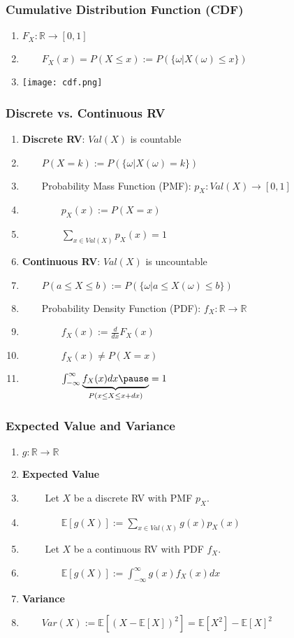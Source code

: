 \documentclass{beamer}
\begin{document}
\begin{frame}
\frametitle{Cumulative Distribution Function (CDF)}
\pause
\begin{enumerate}
\itemsep3em
\item[] $F_X:\mathbb{R}\rightarrow[0, 1]$
\pause
\item[] \indent $\qquad F_X(x)=P(X\leq x)$\pause $:=P(\{\omega|X(\omega)\leq x\})$
\pause 
\item[] \texttt{[image: cdf.png]}
\end{enumerate}
\end{frame}
\begin{frame}
\frametitle{Discrete vs. Continuous RV}
\pause
\begin{enumerate}
\itemsep0.5em
\item[] \textbf{Discrete RV}: $Val(X)$ is countable
\pause
\item[] $\qquad P(X=k):=P(\{\omega|X(\omega)=k\})$
\pause
\item[] $\qquad$Probability Mass Function (PMF): $p_X:Val(X)\rightarrow [0,1]$
\pause 
\item[] $\qquad\qquad p_X(x):=P(X=x)$
\pause 
\item[] $\qquad\qquad \underset{x\in Val(X)}{\sum}p_X(x)=1$
\pause 
\item[] \textbf{Continuous RV}: $Val(X)$ is uncountable
\pause
\item[] \indent $\qquad P(a\leq X\leq b):=P(\{\omega|a\leq X(\omega)\leq b\})$
\pause 
\item[] $\qquad$Probability Density Function (PDF): $f_X:\mathbb{R}\rightarrow\mathbb{R}$
\pause 
\item[] $\qquad\qquad f_X(x):=\frac{d}{dx}F_X(x)$
\pause 
\item[] $\qquad\qquad f_X(x)\neq P(X=x)$
\pause 
\item[] $\qquad\qquad \int_{-\infty}^{\infty}\underbrace{f_X(x)dx\pause}_{P(x\leq X\leq x+dx)}=1$
\end{enumerate}
\end{frame}

\begin{frame}
\frametitle{Expected Value and Variance}
\pause 
\begin{enumerate}
\itemsep1em
\item[] $g:\mathbb{R}\rightarrow\mathbb{R}$
\pause 
\item[] \textbf{Expected Value}
\pause
\item[] $\qquad$ Let $X$ be a discrete RV with PMF $p_X$.
\pause 
\item[] $\qquad\qquad \mathbb{E}[g(X)]:=\underset{x\in Val(X)}{\sum}g(x)p_X(x)$
\pause 
\item[] $\qquad$ Let $X$ be a continuous RV with PDF $f_X$.
\pause 
\item[] $\qquad\qquad \mathbb{E}[g(X)]:=\int_{-\infty}^{\infty}g(x)f_X(x)dx$
\pause
\item[] \textbf{Variance}
\pause 
\item[] $\qquad Var(X):=\mathbb{E}[(X-\mathbb{E}[X])^2]$\pause $ =\mathbb{E}[X^2]-\mathbb{E}[X]^2$
\end{enumerate}
\end{frame}
\end{document}
